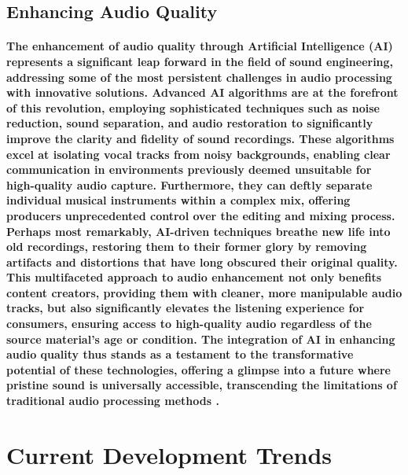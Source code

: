 \documentclass[11pt,a4paper,oneside]{report}
\begin{document}
\subsection{Enhancing Audio Quality}
\paragraph{The enhancement of audio quality through Artificial Intelligence (AI) represents a significant leap forward in the field of sound engineering, addressing some of the most persistent challenges in audio processing with innovative solutions. Advanced AI algorithms are at the forefront of this revolution, employing sophisticated techniques such as noise reduction, sound separation, and audio restoration to significantly improve the clarity and fidelity of sound recordings. These algorithms excel at isolating vocal tracks from noisy backgrounds, enabling clear communication in environments previously deemed unsuitable for high-quality audio capture. Furthermore, they can deftly separate individual musical instruments within a complex mix, offering producers unprecedented control over the editing and mixing process. Perhaps most remarkably, AI-driven techniques breathe new life into old recordings, restoring them to their former glory by removing artifacts and distortions that have long obscured their original quality. This multifaceted approach to audio enhancement not only benefits content creators, providing them with cleaner, more manipulable audio tracks, but also significantly elevates the listening experience for consumers, ensuring access to high-quality audio regardless of the source material's age or condition. The integration of AI in enhancing audio quality thus stands as a testament to the transformative potential of these technologies, offering a glimpse into a future where pristine sound is universally accessible, transcending the limitations of traditional audio processing methods \cite{valentini2018speech}.}

\section{Current Development Trends}
\end{document}
